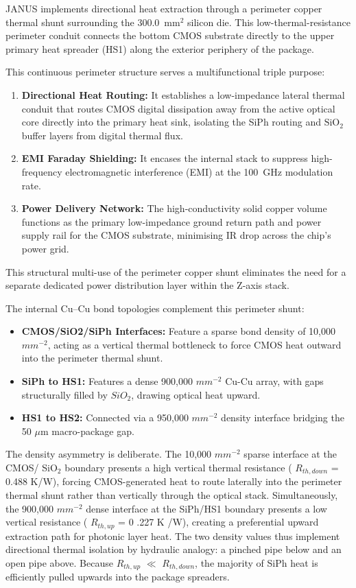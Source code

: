 \documentclass[journal]{IEEEtran}
\begin{document}
JANUS implements directional heat extraction through a perimeter copper thermal shunt surrounding the 300.0~$\text{mm}^{2}$ silicon die. This low-thermal-resistance perimeter conduit connects the bottom CMOS substrate directly to the upper primary heat spreader (HS1) along the exterior periphery of the package.

This continuous perimeter structure serves a multifunctional triple purpose:
\begin{enumerate}
\item \textbf{Directional Heat Routing:} It establishes a low-impedance lateral thermal conduit that routes CMOS digital dissipation away from the active optical core directly into the primary heat sink, isolating the SiPh routing and $\mathrm{SiO_2}$ buffer layers from digital thermal flux.
\item \textbf{EMI Faraday Shielding:} It encases the internal stack to suppress high-frequency electromagnetic interference (EMI) at the 100~GHz modulation rate.
\item \textbf{Power Delivery Network:} The high-conductivity solid copper volume functions as the primary low-impedance ground return path and power supply rail for the CMOS substrate, minimising IR drop across the chip's power grid.
\end{enumerate}

This structural multi-use of the perimeter copper shunt eliminates the need for a separate dedicated power distribution layer within the Z-axis stack.

The internal Cu--Cu bond topologies complement this perimeter shunt:

\begin{itemize}
\item  \textbf{CMOS/SiO2/SiPh Interfaces:} Feature a sparse bond density of 10,000 $mm^{-2}$, acting as a vertical thermal bottleneck to force CMOS heat outward into the perimeter thermal shunt.
\item  \textbf{SiPh to HS1:} Features a dense 900,000 $mm^{-2}$ Cu-Cu array, with gaps structurally filled by $SiO_2$, drawing optical heat upward.
\item  \textbf{HS1 to HS2:} Connected via a 950,000 $mm^{-2}$ density interface bridging the 50 $\mu$m macro-package gap.
\end{itemize}

The density asymmetry is deliberate. The 10,000 $mm^{-2}$ sparse interface at the CMOS/ SiO$_2$ boundary presents a high vertical thermal resistance ( $R_{th,down}$ = 0.488 K/W), forcing CMOS-generated heat to route laterally into the perimeter thermal shunt rather than vertically through the optical stack. Simultaneously, the 900,000 $mm^{-2}$ dense interface at the SiPh/HS1 boundary presents a low vertical resistance ( $R_{th,up}$ = 0 .227 K /W), creating a preferential upward extraction path for photonic layer heat. The two density values thus implement directional thermal isolation by hydraulic analogy: a pinched pipe below and an open pipe above. Because $R_{th,up}$ $\ll$ $R_{th,down}$, the majority of SiPh heat is efficiently pulled upwards into the package spreaders.
\end{document}
